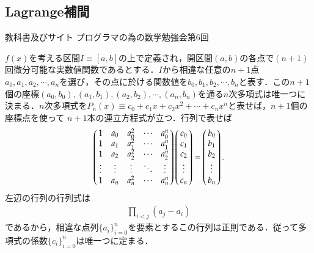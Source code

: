 \documentclass[a4j,papersize,disablejfam,slide,14pt]{jsarticle}
\begin{document}
\subsection{{\rm Lagrange}補間}
	\begin{itembox}[l]{教科書及びサイト}
    	{\rm プログラマの為の数学勉強会第6回\cite{programmer_math}}
    \end{itembox}
	$f(x)$を考える区間$I \equiv [a,b]$の上で定義され，開区間$(a,b)$の各点で$(n+1)$回微分可能な実数値関数であるとする．$I$から相違な任意の$n+1$点
    $a_0, a_1, a_2, \cdots, a_n$を選び，その点に於ける関数値を$b_0, b_1, b_2, \cdots, b_n$と表す．この$n+1$個の座標$(a_0, b_0), (a_1, b_1), (a_2, b_2),
    \cdots, (a_n, b_n)$を通る$n$次多項式は唯一つに決まる．$n$次多項式を$P_n(x)\equiv c_0 + c_1 x + c_2 x^2 + \cdots + c_n x^n$と表せば，$n+1$個の座標点を使って
    $n+1$本の連立方程式が立つ．行列で表せば
    \begin{align}
    	\left(
    	\begin{array}{@{\,}ccccc@{\,}}
    		1 & a_0 & a_0^2 & \cdots & a_0^n \\
            1 & a_1 & a_1^2 & \cdots & a_1^n \\
            1 & a_2 & a_2^2 & \cdots & a_2^n \\
            \vdots & \vdots & \vdots & \ddots & \vdots \\
            1 & a_n & a_n^2 & \cdots & a_n^n
    	\end{array}
    	\right)
        \left(
    	\begin{array}{@{\,}c@{\,}}
    		c_0 \\
            c_1 \\
            c_2 \\
            \vdots \\
            c_n
    	\end{array}
    	\right)
    	= \left(
    	\begin{array}{@{\,}c@{\,}}
    		b_0 \\
            b_1 \\
            b_2 \\
            \vdots \\
            b_n
    	\end{array}
    	\right).
    \end{align}
    左辺の行列の行列式は
    \begin{align}
    	\prod_{i < j} (a_j - a_i)
    \end{align}
    であるから，相違な点列$\{a_i\}_{i=0}^{n}$を要素とするこの行列は正則である．従って多項式の係数$\{c_i\}_{i=0}^{n}$は唯一つに定まる．
\end{document}
